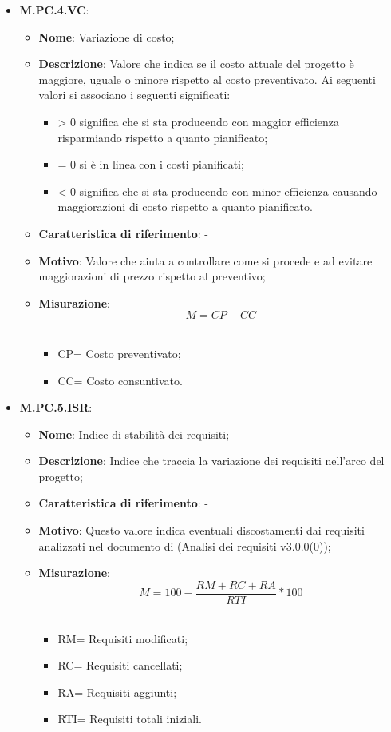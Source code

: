 \documentclass[10pt, a4paper]{article}
\begin{document}
\begin{itemize}
    \item \textbf{M.PC.4.VC}:
    \begin{itemize}
        \item \textbf{Nome}: Variazione di costo;
        \item \textbf{Descrizione}: Valore che indica se il costo attuale del progetto è maggiore, uguale o minore rispetto al costo preventivato. Ai seguenti valori si associano i seguenti significati:
        \begin{itemize}
            \item > 0 significa che si sta producendo con maggior efficienza risparmiando rispetto a quanto pianificato;
            \item = 0 si è in linea con i costi pianificati;
            \item < 0 significa che si sta producendo con minor efficienza causando maggiorazioni di costo rispetto a quanto pianificato.
        \end{itemize}
        \item \textbf{Caratteristica di riferimento}: -
        \item \textbf{Motivo}: Valore che aiuta a controllare come si procede e ad evitare maggiorazioni di prezzo rispetto al preventivo; 
        \item \textbf{Misurazione}:  \[ M=CP-CC \] \\
        \begin{itemize}
        \item CP= Costo preventivato;
        \item CC= Costo consuntivato.\\
        \end{itemize}
    \end{itemize}

    \item \textbf{M.PC.5.ISR}:
    \begin{itemize}
        \item \textbf{Nome}: Indice di stabilità dei requisiti;
        \item \textbf{Descrizione}: Indice che traccia la variazione dei requisiti nell’arco del progetto;
        \item \textbf{Caratteristica di riferimento}: -
        \item \textbf{Motivo}: Questo valore indica eventuali discostamenti dai requisiti analizzati nel documento di (Analisi dei requisiti v3.0.0(0)); 
        \item \textbf{Misurazione}: \[ M=100- \frac{RM + RC + RA}{RTI} *100 \] \\
        \begin{itemize}
        \item RM= Requisiti modificati;
        \item RC= Requisiti cancellati;
        \item RA= Requisiti aggiunti;
        \item RTI= Requisiti totali iniziali.\\
        \end{itemize}
    \end{itemize}


\end{itemize}
\end{document}

